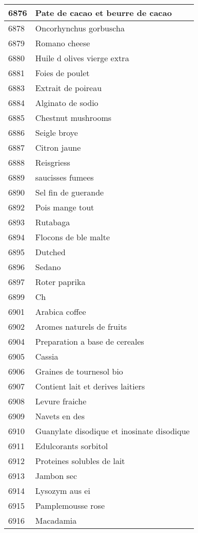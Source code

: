 \begin{longtable}{|l|l|}
6876 & Pate de cacao et beurre de cacao \\ \hline 
6878 & Oncorhynchus gorbuscha \\ \hline 
6879 & Romano cheese \\ \hline 
6880 & Huile d olives vierge extra \\ \hline 
6881 & Foies de poulet \\ \hline 
6883 & Extrait de poireau \\ \hline 
6884 & Alginato de sodio \\ \hline 
6885 & Chestnut mushrooms \\ \hline 
6886 & Seigle broye \\ \hline 
6887 & Citron jaune \\ \hline 
6888 & Reisgriess \\ \hline 
6889 & saucisses fumees \\ \hline 
6890 & Sel fin de guerande \\ \hline 
6892 & Pois mange tout \\ \hline 
6893 & Rutabaga \\ \hline 
6894 & Flocons de ble malte \\ \hline 
6895 & Dutched \\ \hline 
6896 & Sedano \\ \hline 
6897 & Roter paprika \\ \hline 
6899 & Ch \\ \hline 
6901 & Arabica coffee \\ \hline 
6902 & Aromes naturels de fruits \\ \hline 
6904 & Preparation a base de cereales \\ \hline 
6905 & Cassia \\ \hline 
6906 & Graines de tournesol bio \\ \hline 
6907 & Contient lait et derives laitiers \\ \hline 
6908 & Levure fraiche \\ \hline 
6909 & Navets en des \\ \hline 
6910 & Guanylate disodique et inosinate disodique \\ \hline 
6911 & Edulcorants sorbitol \\ \hline 
6912 & Proteines solubles de lait \\ \hline 
6913 & Jambon sec \\ \hline 
6914 & Lysozym aus ei \\ \hline 
6915 & Pamplemousse rose \\ \hline 
6916 & Macadamia \\ \hline 

\end{longtable}
